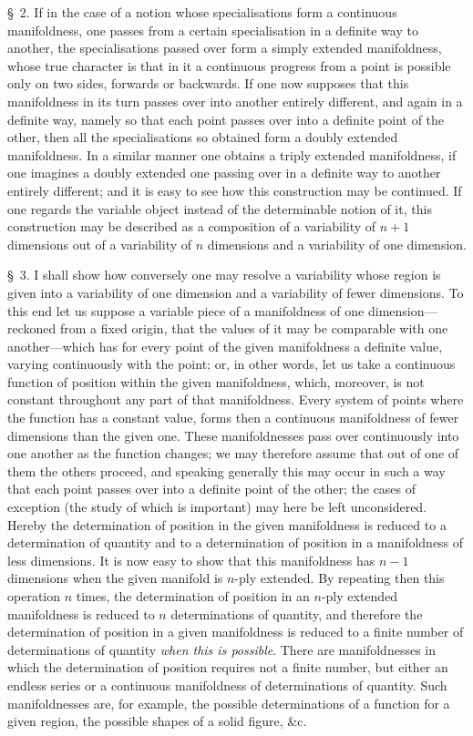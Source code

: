 \documentclass[a4paper,12pt]{article}
\begin{document}
\bigbreak

\S~2.
If in the case of a notion whose specialisations form a
continuous manifoldness, one passes from a certain specialisation
in a definite way to another, the specialisations passed over
form a simply extended manifoldness, whose true character is that
in it a continuous progress from a point is possible only on two
sides, forwards or backwards.  If one now supposes that this
manifoldness in its turn passes over into another entirely
different, and again in a definite way, namely so that each point
passes over into a definite point of the other, then all the
specialisations so obtained form a doubly extended manifoldness.
In a similar manner one obtains a triply extended manifoldness,
if one imagines a doubly extended one passing over in a definite
way to another entirely different; and it is easy to see how this
construction may be continued.  If one regards the variable
object instead of the determinable notion of it, this
construction may be described as a composition of a variability of
$n + 1$ dimensions out of a variability of $n$ dimensions and a
variability of one dimension.

\bigbreak

\S~3.
I shall show how conversely one may resolve a variability whose
region is given into a variability of one dimension and a
variability of fewer dimensions.  To this end let us suppose a
variable piece of a manifoldness of one dimension---reckoned from
a fixed origin, that the values of it may be comparable with one
another---which has for every point of the given manifoldness a
definite value, varying continuously with the point; or, in other
words, let us take a continuous function of position within the
given manifoldness, which, moreover, is not constant throughout
any part of that manifoldness.  Every system of points where the
function has a constant value, forms then a continuous
manifoldness of fewer dimensions than the given one.  These
manifoldnesses pass over continuously into one another as the
function changes; we may therefore assume that out of one of them
the others proceed, and speaking generally this may occur in such
a way that each point passes over into a definite point of the
other; the cases of exception (the study of which is important)
may here be left unconsidered.  Hereby the determination of
position in the given manifoldness is reduced to a determination
of quantity and to a determination of position in a manifoldness
of less dimensions.  It is now easy to show that this
manifoldness has $n - 1$ dimensions when the given manifold is
$n$-ply extended.  By repeating then this operation $n$ times,
the determination of position in an $n$-ply extended manifoldness
is reduced to $n$ determinations of quantity, and therefore the
determination of position in a given manifoldness is reduced to a
finite number of determinations of quantity \emph{when this is
possible}.  There are manifoldnesses in which the determination
of position requires not a finite number, but either an endless
series or a continuous manifoldness of determinations of
quantity.  Such manifoldnesses are, for example, the possible
determinations of a function for a given region, the possible
shapes of a solid figure, \&c.
\end{document}
